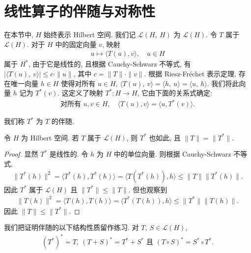 \documentclass[../../main.tex]{subfiles}
\begin{document}
\section{线性算子的伴随与对称性}\label{section:ch16-adjoint}

在本节中, $H$ 始终表示 Hilbert 空间. 我们记 $\mathcal{L}(H,\ H)$ 为 $\mathcal{L}(H)$. 令 $T$ 属于 $\mathcal{L}(H)$. 对于 $H$ 中的固定向量 $v$, 映射
\begin{align*}
u\mapsto\langle T(u),v\rangle,\quad u\in H
\end{align*}
属于 $H^{*}$, 由于它是线性的, 且根据 Cauchy-Schwarz 不等式, 有 $|\langle T(u),\ v\rangle|\leqslant c\cdot\|u\|$, 其中 $c=\|T\|\cdot\|v\|$. 根据 Riesz-Fr\'echet 表示定理, 存在唯一向量 $h\in H$ 使得对所有 $u\in H$, $\langle T(u),\ v\rangle=\langle h,\ u\rangle=\langle u,\ h\rangle$. 我们将此向量 $h$ 记为 $T^{*}(v)$. 这定义了映射 $T^{*}:H\to H$, 它由下面的关系式确定:
\begin{align}
\text{对所有 }u,v\in H,\quad\langle T(u),v\rangle=\langle u,T^{*}(v)\rangle.\label{align:ch16-adjoint-def}
\end{align}

我们称 $T^{*}$ 为 $T$ 的伴随.

\begin{proposition}\label{proposition:ch16-adjoint-bounded}
令 $H$ 为 Hilbert 空间. 若 $T$ 属于 $\mathcal{L}(H)$, 则 $T^{*}$ 也如此, 且 $\|T\|=\|T^{*}\|$.
\end{proposition}

\begin{proof}
显然 $T^{*}$ 是线性的. 令 $h$ 为 $H$ 中的单位向量. 则根据 Cauchy-Schwarz 不等式,
\begin{align*}
\|T^{*}(h)\|^{2}=\langle T^{*}(h),T^{*}(h)\rangle=\langle T(T^{*}(h)),h\rangle\leqslant\|T\|\|T^{*}(h)\|.
\end{align*}
因此 $T^{*}$ 属于 $\mathcal{L}(H)$ 且 $\|T^{*}\|\leqslant\|T\|$. 但也观察到
\begin{align*}
\|T(h)\|^{2}=\langle T(h),T(h)\rangle=\langle T^{*}(T(h)),h\rangle\leqslant\|T^{*}\|\|T(h)\|.
\end{align*}
因此 $\|T\|\leqslant\|T^{*}\|$.
\end{proof}

我们把证明伴随的以下结构性质留作练习. 对 $T,\ S\in\mathcal{L}(H)$,
\begin{align}
(T^{*})^{*}=T,\ (T+S)^{*}=T^{*}+S^{*}\text{ 且 }(T\circ S)^{*}=S^{*}\circ T^{*}.\label{align:ch16-adjoint-algebra}
\end{align}
\end{document}
